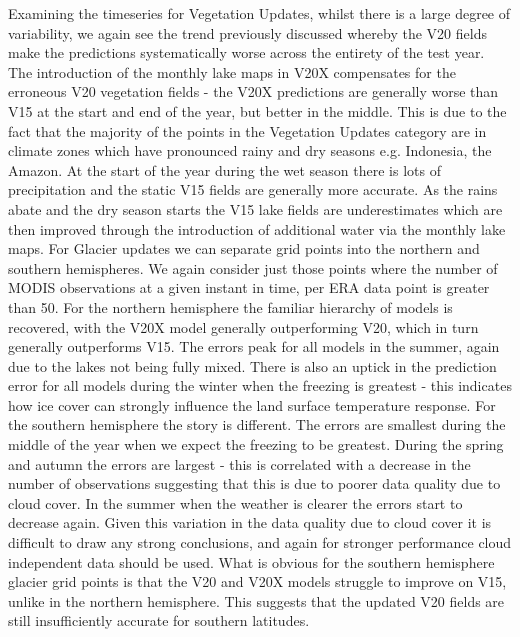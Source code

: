 \documentclass[hess, manuscript]{copernicus}
\begin{document}
Examining the timeseries for Vegetation Updates, whilst there is a large degree of variability, we again see the trend previously discussed whereby the V20 fields make the predictions systematically worse across the entirety of the test year. The introduction of the monthly lake maps in V20X compensates for the erroneous V20 vegetation fields - the V20X predictions are generally worse than V15 at the start and end of the year, but better in the middle. This is due to the fact that the majority of the points in the Vegetation Updates category are in climate zones which have pronounced rainy and dry seasons e.g. Indonesia, the Amazon. At the start of the year during the wet season there is lots of precipitation and the static V15 fields are generally more accurate. As the rains abate and the dry season starts the V15 lake fields are underestimates which are then improved through the introduction of additional water via the monthly lake maps.
For Glacier updates we can separate grid points into the northern and southern hemispheres. We again consider just those points where the number of MODIS observations at a given instant in time, per ERA data point is greater than 50. For the northern hemisphere the familiar hierarchy of models is recovered, with the V20X model generally outperforming V20, which in turn generally outperforms V15. The errors peak for all models in the summer, again due to the lakes not being fully mixed. There is also an uptick in the prediction error for all models during the winter when the freezing is greatest - this indicates how ice cover can strongly influence the land surface temperature response. For the southern hemisphere the story is different. The errors are smallest during the middle of the year when we expect the freezing to be greatest. During the spring and autumn the errors are largest - this is correlated with a decrease in the number of observations suggesting that this is due to poorer data quality due to cloud cover. In the summer when the weather is clearer the errors start to decrease again. Given this variation in the data quality due to cloud cover it is difficult to draw any strong conclusions, and again for stronger performance cloud independent data should be used. What is obvious for the southern hemisphere glacier grid points is that the V20 and V20X models struggle to improve on V15, unlike in the northern hemisphere. This suggests that the updated V20 fields are still insufficiently accurate for southern latitudes.
\end{document}
